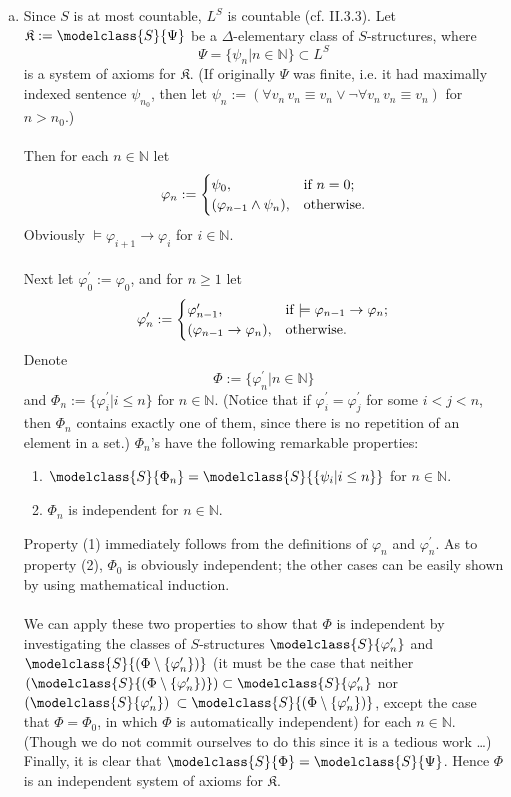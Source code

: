 \begin{enumerate}[1.]
\begin{enumerate}[(a)]
\item Since $S$ is at most countable, $L^S$ is countable (cf. II.3.3). Let $\mathfrak{K} := \modelclass{S}{\Psi}$ be a $\Delta$-elementary class of $S$-structures, where
\[
\Psi = \{ \psi_n | n \in \mathbb{N} \} \subset L^S
\]
is a system of axioms for $\mathfrak{K}$. (If originally $\Psi$ was finite, i.e. it had maximally indexed sentence $\psi_{n_0}$, then let $\psi_n := (\forall v_n \, v_n \equiv v_n \lor \neg \forall v_n \, v_n \equiv v_n)$ for $n > n_0$.)\\
\\
Then for each $n \in \mathbb{N}$ let
\[
\varphi_n := \begin{cases}
\psi_0, & \mbox{if \(n = 0\);} \cr
(\varphi_{n-1} \land \psi_n), & \mbox{otherwise.} \cr
\end{cases}
\]
Obviously $\models \varphi_{i+1} \rightarrow \varphi_i$ for $i \in \mathbb{N}$.\\
\\
Next let $\varphi_0^\prime := \varphi_0$, and for $n \geq 1$ let
\[
\varphi_n^\prime := \begin{cases}
\varphi_{n-1}^\prime, & \mbox{if \(\models \varphi_{n-1} \rightarrow \varphi_n\);} \cr
(\varphi_{n-1} \rightarrow \varphi_n), & \mbox{otherwise.}
\end{cases}
\]
Denote
\[
\Phi := \{ \varphi_n^\prime | n \in \mathbb{N} \}
\]
and $\Phi_n := \{ \varphi_i^\prime | i \leq n \}$ for $n \in \mathbb{N}$. (Notice that if $\varphi_i^\prime = \varphi_j^\prime$ for some $i < j < n$, then $\Phi_n$ contains exactly one of them, since there is no repetition of an element in a set.) $\Phi_n$'s have the following remarkable properties:
\begin{enumerate}[(1)]
\item $\modelclass{S}{\Phi_n} = \modelclass{S}{\{ \psi_i | i \leq n \}}$ for $n \in \mathbb{N}$.
\item $\Phi_n$ is independent for $n \in \mathbb{N}$.
\end{enumerate}
Property (1) immediately follows from the definitions of $\varphi_n$ and $\varphi_n^\prime$. As to property (2), $\Phi_0$ is obviously independent; the other cases can be easily shown by using mathematical induction.\\
\\
We can apply these two properties to show that $\Phi$ is independent by investigating the classes of $S$-structures $\modelclass{S}{\varphi_n^\prime}$ and $\modelclass{S}{(\Phi \setminus \{\varphi_n^\prime\})}$ (it must be the case that neither $(\modelclass{S}{(\Phi \setminus \{\varphi_n^\prime\})}) \subset \modelclass{S}{\varphi_n^\prime}$ nor $(\modelclass{S}{\varphi_n^\prime})$ $\subset \modelclass{S}{(\Phi \setminus \{\varphi_n^\prime\})}$, except the case that $\Phi = \Phi_0$, in which $\Phi$ is automatically independent) for each $n \in \mathbb{N}$. (Though we do not commit ourselves to do this since it is a tedious work \ldots ) Finally, it is clear that $\modelclass{S}{\Phi} = \modelclass{S}{\Psi}$. Hence $\Phi$ is an independent system of axioms for $\mathfrak{K}$.

\end{enumerate}
\end{enumerate}
